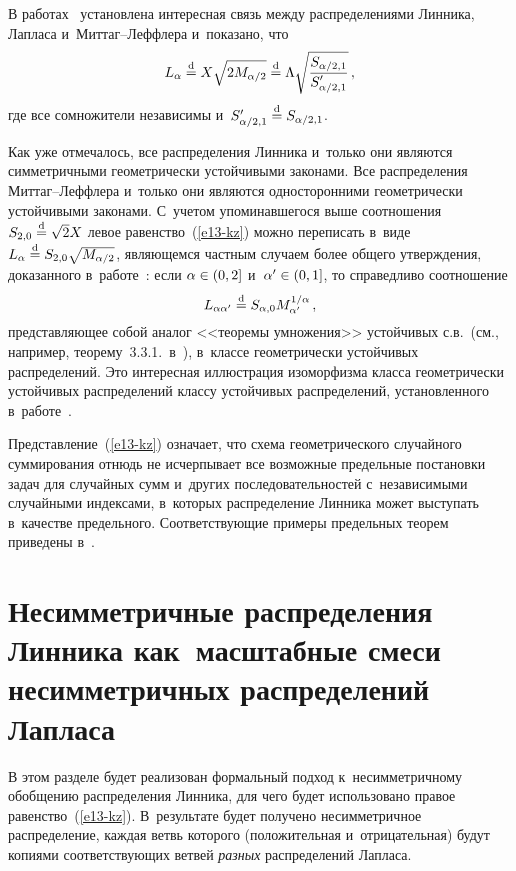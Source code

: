 \begin{multicols}{2}
В работах~\cite{KorolevZeifman2016b, KotzOstrovskii1996} установлена
интересная связь между распределениями Линника, Лапласа 
и~Мит\-таг--Леф\-фле\-ра и~показано, что
\begin{equation}
L_{\alpha}\stackrel{\mathrm{d}}{=} X\sqrt{2M_{\alpha/2}}\stackrel{\mathrm{d}}{=}
\Lambda\sqrt{\displaystyle\frac{\displaystyle S_{\alpha/2,1}\mathstrut}{\displaystyle S'_{\alpha/2,1}\mathstrut}}\,,
\label{e13-kz}
\end{equation}
где все сомножители независимы и~$S'_{\alpha/2,1}\stackrel{\mathrm{d}}{=}
S_{\alpha/2,1}$.

Как уже отмечалось, все распределения Линника и~только они являются
симметричными геометрически устойчивыми законами. Все распределения
Мит\-таг--Леф\-фле\-ра и~только они являются односторонними геометрически
устойчивыми законами. С~учетом упоминавшегося выше соотношения
$S_{2,0}\stackrel{\mathrm{d}}{=}\sqrt{2}X$ левое равенство~(\ref{e13-kz}) можно переписать в~виде
$L_{\alpha}\stackrel{\mathrm{d}}{=} S_{2,0}\sqrt{M_{\alpha/2}}$, являющемся частным
случаем более общего утверждения, доказанного в~работе~\cite{KorolevZeifman2016b}: 
если $\alpha\hm\in(0,2]$ и~$\alpha'\hm\in(0,1]$, то справедливо соотношение
$$
L_{\alpha\alpha'}\stackrel{\mathrm{d}}{=} S_{\alpha,0}M_{\alpha'}^{1/\alpha}\,,
$$
представляющее собой аналог <<теоремы умножения>> устойчивых
с.в.\ (см., например, теорему~3.3.1.\
в~\cite{Zolotarev1983}), в~классе геометрически устойчивых
распределений. Это интересная иллюстрация изоморфизма класса
геометрически устойчивых распределений классу устойчивых
распределений, установленного в~работе~\cite{KlebanovManiaMelamed1984}.

Представление~(\ref{e13-kz}) означает, что схема гео\-мет\-ри\-че\-ско\-го случайного
суммирования отнюдь не исчерпывает все возможные предельные
постановки задач для случайных сумм и~других последовательностей 
с~независимыми случайными индексами, в~которых распределение Линника
может выступать в~качестве предельного. Соответствующие примеры
предельных теорем приведены в~\cite{KorolevZeifman2016b}.

\section{Несимметричные распределения Линника
как~масштабные смеси несимметричных распределений Лапласа}

В этом разделе будет реализован формальный подход к~несимметричному
обобщению распределения Линника, для чего будет использовано правое
равенство~(\ref{e13-kz}). В~результате будет получено несимметричное
распределение, каждая ветвь которого (положительная и~отрицательная)
будут копиями соответствующих ветвей \textit{разных} распределений
Лап\-ласа.


\end{multicols}

